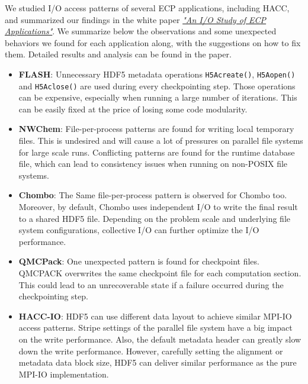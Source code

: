 We studied I/O access patterns of several ECP applications, including HACC, and summarized our findings in the white paper \href{http://portal.hdfgroup.org/display/HDF5/Parallel+HDF5} {\emph{"An I/O Study of ECP Applications"}}. 
We summarize below the observations and some unexpected behaviors we found for each application along, with the suggestions on how to fix them. Detailed results and analysis can be found in the paper. 
\begin{itemize}
    \item \textbf{FLASH}: Unnecessary HDF5 metadata operations \texttt{H5Acreate()}, \texttt{H5Aopen()} and \texttt{H5Aclose()} are used during every checkpointing step. Those operations can be expensive, especially when running a large number of iterations. This can be easily fixed at the price of losing some code modularity. 
    \item \textbf{NWChem}: File-per-process patterns are found for writing local temporary files. This is undesired and will cause a lot of pressures on parallel file systems for large scale runs. Conflicting patterns are found for the runtime database file, which can lead to consistency issues when running on non-POSIX file systems.
    \item \textbf{Chombo}: The Same file-per-process pattern is observed for Chombo too. Moreover, by default, Chombo uses independent I/O to write the final result to a shared HDF5 file. Depending on the problem scale and underlying file system configurations, collective I/O can further optimize the I/O performance.
    \item \textbf{QMCPack}: One unexpected pattern is found for checkpoint files. QMCPACK overwrites the same checkpoint file for each computation section. This could lead to an unrecoverable state if a failure occurred during the checkpointing step.
    \item \textbf{HACC-IO}: HDF5 can use different data layout to achieve similar MPI-IO access patterns. Stripe settings of the parallel file system have a big impact on the write performance. Also, the default metadata header can greatly slow down the write performance. However, carefully setting the alignment or metadata data block size, HDF5 can deliver similar performance as the pure MPI-IO implementation. 
\end{itemize}

